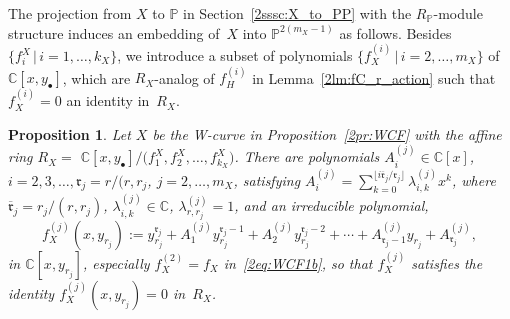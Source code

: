 \documentclass[pdftex]{sigma}
\def\CC{{\mathbb C}}
\def\PP{{\mathbb P}}
\def\fr{{\mathfrak r}}
\def\Bfr{{\overline{\mathfrak r}}}
\numberwithin{equation}{section}
\newtheorem{Proposition}[Theorem]{Proposition}
 { \theoremstyle{definition}
\newtheorem{Definition}[Theorem]{Definition}
\newtheorem{Note}[Theorem]{Note}
\newtheorem{Example}[Theorem]{Example}
\newtheorem{Remark}[Theorem]{Remark} }
\begin{document}
The projection from $X$ to $\PP$ in Section~\ref{2sssc:X_to_PP} with the $R_\PP$-module structure induces an embedding of~$X$ into $\PP^{2(m_X-1)}$ as follows.
Besides $\big\{f^X_i\, |\,i =1, \dots, k_X\big\}$, we introduce a subset of polynomials $\big\{f_X^{(i)} \, | \, i = 2, \dots, m_X\big\}$ of $\CC[x,y_\bullet]$, which are $R_X$-analog of $f_H^{(i)}$ in Lemma~\ref{2lm:fC_r_action} such that $f_X^{(i)}=0$ an identity in~$R_X$.

\begin{Proposition}\label{2pr:WCF2}
Let $X$ be the W-curve in Proposition~{\rm \ref{2pr:WCF}} with the affine ring $R_X=$\break
$\CC[x,y_{\bullet}]/\big(f^X_1, f^X_2, \dots, f^X_{k_X}\big)$.
There are polynomials $A^{(j)}_i\in \CC[x]$, $i=2, 3, \dots, \fr_j=r/(r,r_j$, $j=2, \dots, m_X$, satisfying $ A^{(j)}_i = \sum_{k=0}^{\lfloor i \Bfr_j/\fr_j\rfloor} \lambda^{(j)}_{i, k} x^k$, where $\Bfr_j = r_j/(r, r_j)$, $\lambda^{(j)}_{i,k} \in \CC$, $\lambda^{(j)}_{r,r_j}=1$, and an irreducible polynomial,
\begin{equation}
f^{(j)}_X(x,y_{r_j}):=y_{r_j}^{\fr_j} + A^{(j)}_{1} y_{r_j}^{\fr_j-1}
+ A^{(j)}_{2} y_{r_j}^{\fr_j-2}
+\cdots + A^{(j)}_{\fr_j-1} y_{r_j}
 + A^{(j)}_{\fr_j},
\label{2eq:WCF1b3}
\end{equation}
in $\CC[x,y_{r_j}]$, especially $f_X^{(2)}=f_X$ in~\eqref{2eq:WCF1b}, so that $f^{(j)}_X$ satisfies the identity $f^{(j)}_X(x,y_{r_j})=0$ in~$R_X$.
\end{Proposition}
\end{document}
